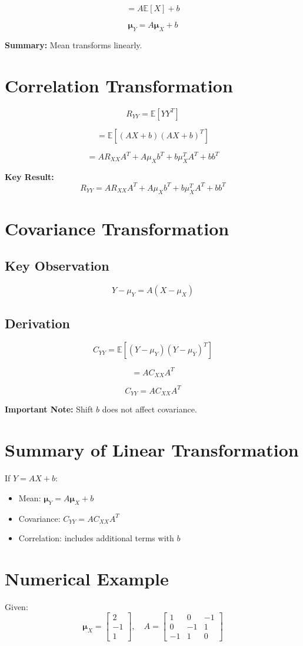 \documentclass[12pt]{article}
\begin{document}
\[
= A\mathbb{E}[X] + b
\]

\[
\boxed{\bm{\mu}_Y = A\bm{\mu}_X + b}
\]

\textbf{Summary:} Mean transforms linearly.

\section{Correlation Transformation}
\[
R_{YY} = \mathbb{E}[YY^T]
\]

\[
= \mathbb{E}[(AX+b)(AX+b)^T]
\]

\[
= AR_{XX}A^T + A\mu_X b^T + b\mu_X^T A^T + bb^T
\]

\textbf{Key Result:}
\[
\boxed{R_{YY} = AR_{XX}A^T + A\mu_X b^T + b\mu_X^T A^T + bb^T}
\]

\section{Covariance Transformation}
\subsection{Key Observation}
\[
Y - \mu_Y = A(X - \mu_X)
\]

\subsection{Derivation}
\[
C_{YY} = \mathbb{E}[(Y-\mu_Y)(Y-\mu_Y)^T]
\]

\[
= A C_{XX} A^T
\]

\[
\boxed{C_{YY} = A C_{XX} A^T}
\]

\textbf{Important Note:} Shift $b$ does not affect covariance.

\section{Summary of Linear Transformation}
If $Y = AX + b$:
\begin{itemize}
    \item Mean: $\bm{\mu}_Y = A\bm{\mu}_X + b$
    \item Covariance: $C_{YY} = AC_{XX}A^T$
    \item Correlation: includes additional terms with $b$
\end{itemize}

\section{Numerical Example}
Given:
\[
\bm{\mu}_X =
\begin{bmatrix}
2\\-1\\1
\end{bmatrix}, \quad
A =
\begin{bmatrix}
1 & 0 & -1\\
0 & -1 & 1\\
-1 & 1 & 0
\end{bmatrix}
\]
\end{document}
